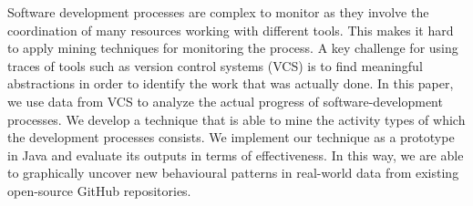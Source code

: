 
	
Software development processes are complex to monitor as they involve the coordination of many resources working with different tools.
This makes it hard to apply mining techniques for monitoring the process. 
A key challenge for using traces of tools such as version control systems (VCS) is to find meaningful abstractions in order to identify the work that was actually done. 
In this paper, we use data from VCS to analyze the actual progress of software-development processes. We develop a technique that is able to mine the activity types of which the development processes consists. 
We implement our technique as a prototype in Java and evaluate its outputs in terms of effectiveness.
In this way, we are able to graphically uncover new behavioural patterns in real-world data from existing open-source GitHub repositories.




